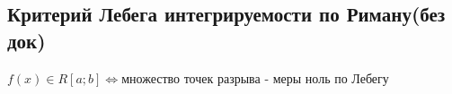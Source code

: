 \subsection{Критерий Лебега интегрируемости по Риману(без док)}

\begin{theorem}
    $f(x) \in R[a; b] \iff \text{множество точек разрыва - меры ноль по Лебегу}$
\end{theorem}